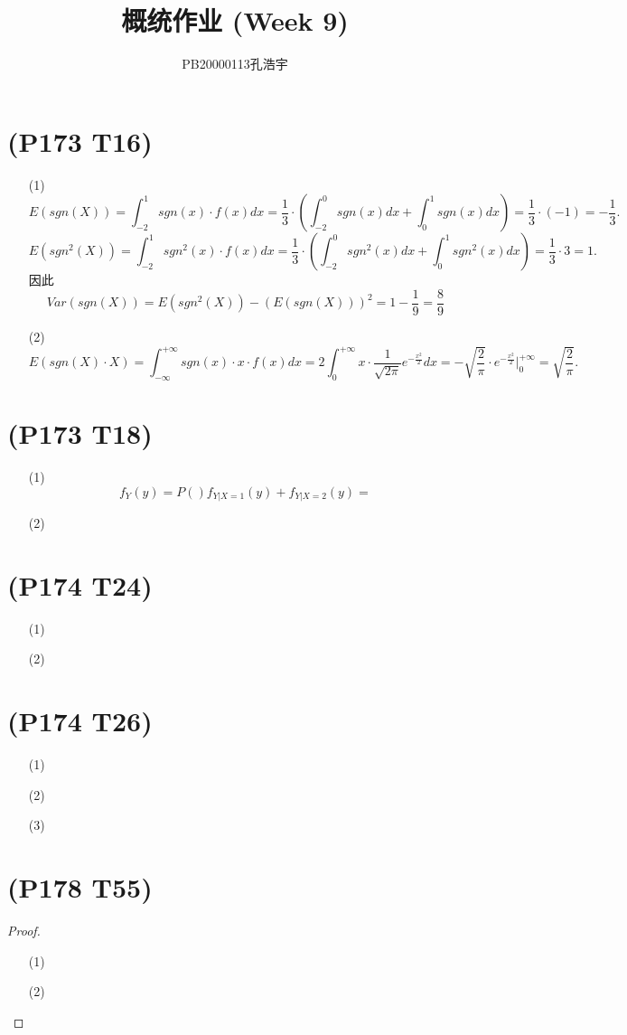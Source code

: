 \documentclass{article}
\title{概统作业 (Week 9)}
\author{PB20000113孔浩宇}
\begin{document}
\maketitle
\section{(P173 T16)}  %
\begin{enumerate}
    \item [(1)]
    \[
        E(sgn (X)) 
        = \int_{-2}^{1} sgn(x)\cdot f(x) dx
        = \frac{1}{3}\cdot \left(\int_{-2}^{0}sgn(x) dx + \int_{0}^{1} sgn(x) dx\right) 
        = \frac{1}{3} \cdot (-1)
        = -\frac{1}{3}.   
    \]
    \[
        E({sgn}^2 (X))
        = \int_{-2}^{1} {sgn}^2 (x) \cdot f(x) dx
        = \frac{1}{3} \cdot \left(\int_{-2}^{0} {sgn}^{2}(x) dx  + \int_{0}^{1} {sgn}^{2} (x) dx \right)
        = \frac{1}{3} \cdot 3
        = 1.
    \]
    因此
    \[
        Var(sgn(X))
        = E({sgn}^2 (X)) - {\left(E(sgn(X))\right)}^2  
        = 1 - \frac{1}{9}
        = \frac{8}{9} 
    \]
    \item [(2)]
    \[
        E(sgn(X) \cdot X)
        = \int_{-\infty}^{+\infty} sgn(x) \cdot x \cdot f(x) dx    
        = 2 \int_{0}^{+\infty} x \cdot \frac{1}{\sqrt{2\pi}} e^{-\frac{x^2}{2}} dx
        = - \sqrt{\frac{2}{\pi}} \cdot e^{-\frac{x^2}{2}} \big| _{0}^{+\infty}
        = \sqrt{\frac{2}{\pi}}.
    \]
\end{enumerate}

\section{(P173 T18)}  %
\begin{enumerate}
    \item [(1)]
    \[
        f_{Y} (y)
        = P()f_{Y|X=1} (y) + f_{Y|X=2} (y)
        =     
    \]
    \item [(2)]
\end{enumerate}

\section{(P174 T24)}  %
\begin{enumerate}
    \item [(1)]
    \item [(2)]
\end{enumerate}

\section{(P174 T26)}  %
\begin{enumerate}
    \item [(1)]
    \item [(2)]
    \item [(3)]
\end{enumerate}

\section{(P178 T55)}  %
\begin{proof}
    \begin{enumerate}
        \item []
        \item [(1)]
        \item [(2)]
    \end{enumerate}
\end{proof}
\end{document}
